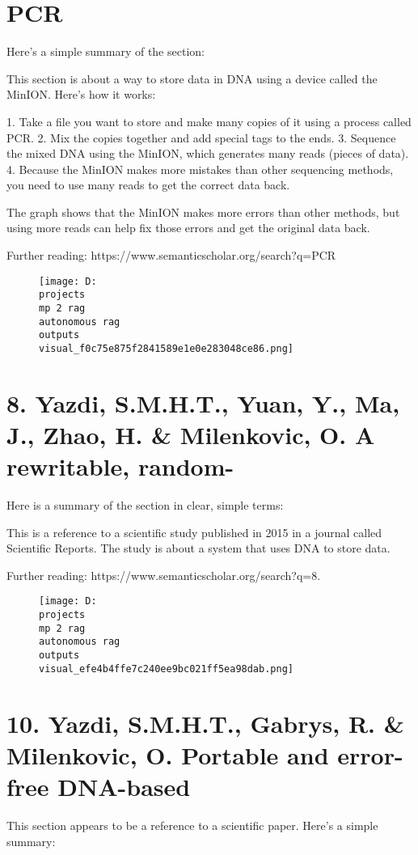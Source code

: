 \documentclass[12pt,a4paper]{article}
\begin{document}
\section{PCR}
Here's a simple summary of the section:

This section is about a way to store data in DNA using a device called the MinION. Here's how it works:

1. Take a file you want to store and make many copies of it using a process called PCR.
2. Mix the copies together and add special tags to the ends.
3. Sequence the mixed DNA using the MinION, which generates many reads (pieces of data).
4. Because the MinION makes more mistakes than other sequencing methods, you need to use many reads to get the correct data back.

The graph shows that the MinION makes more errors than other methods, but using more reads can help fix those errors and get the original data back.

Further reading: https://www.semanticscholar.org/search?q=PCR
\begin{figure}[h]
\centering
\texttt{[image: D:\\projects\\mp 2 rag\\autonomous rag\\outputs\\visual\_f0c75e875f2841589e1e0e283048ce86.png]}
\end{figure}
\section{8.	 Yazdi, S.M.H.T., Yuan, Y., Ma, J., Zhao, H. & Milenkovic, O. A rewritable, random-}
Here is a summary of the section in clear, simple terms:

This is a reference to a scientific study published in 2015 in a journal called Scientific Reports. The study is about a system that uses DNA to store data.

Further reading: https://www.semanticscholar.org/search?q=8.	%
\begin{figure}[h]
\centering
\texttt{[image: D:\\projects\\mp 2 rag\\autonomous rag\\outputs\\visual\_efe4b4ffe7c240ee9bc021ff5ea98dab.png]}
\end{figure}
\section{10.	Yazdi, S.M.H.T., Gabrys, R. & Milenkovic, O. Portable and error-free DNA-based}
This section appears to be a reference to a scientific paper. Here's a simple summary:
\end{document}
